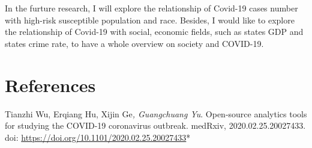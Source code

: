 \documentclass[12pt,]{article}
\begin{document}
In the furture research, I will explore the relationship of Covid-19
cases number with high-risk susceptible population and race. Besides, I
would like to explore the relationship of Covid-19 with social, economic
fields, such as states GDP and states crime rate, to have a whole
overview on society and COVID-19.

\newpage

\hypertarget{references}{%
\section{References}\label{references}}

Tianzhi Wu, Erqiang Hu, Xijin Ge\emph{, Guangchuang Yu}. Open-source
analytics tools for studying the COVID-19 coronavirus outbreak. medRxiv,
2020.02.25.20027433. doi:
\url{https://doi.org/10.1101/2020.02.25.20027433}*
\end{document}
